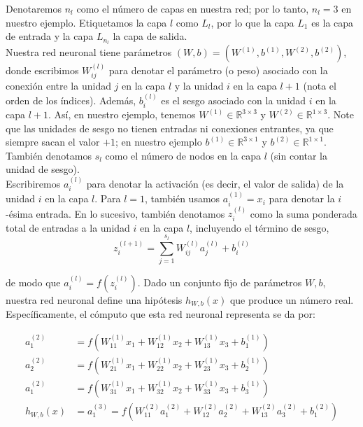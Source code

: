 Denotaremos $n_l$ como el número de capas en nuestra red; por lo tanto, $n_l = 3$ en nuestro ejemplo. Etiquetamos la capa $l$ como $L_l$, por lo que la capa $L_1$ es la capa de entrada y la capa $L_{n_l}$ la capa de salida. \\

Nuestra red neuronal tiene parámetros $(W, b) = (W^{(1)}, b^{(1)}, W^{(2)}, b^{(2)})$, donde escribimos $W_{ij}^{(l)}$ para denotar el parámetro (o peso) asociado con la conexión entre la unidad $j$ en la capa $l$ y la unidad $i$ en la capa $l+1$ (nota el orden de los índices). Además, $b_i^{(l)}$ es el sesgo asociado con la unidad $i$ en la capa $l+1$. Así, en nuestro ejemplo, tenemos $W^{(1)} \in \mathbb{R}^{3 \times 3}$ y $W^{(2)} \in \mathbb{R}^{1 \times 3}$. Note que las unidades de sesgo no tienen entradas ni conexiones entrantes, ya que siempre sacan el valor $+1$; en nuestro ejemplo $b^{(1)} \in \mathbb{R}^{3 \times 1}$ y $b^{(2)} \in \mathbb{R}^{1 \times 1}$. También denotamos $s_l$ como el número de nodos en la capa $l$ (sin contar la unidad de sesgo). \\

Escribiremos $a^{(l)}_i$ para denotar la activación (es decir, el valor de salida) de la unidad $i$ en la capa $l$. Para $l = 1$, también usamos $a^{(1)}_i = x_i$ para denotar la $i$-ésima entrada. En lo sucesivo, también denotamos $z^{(l)}_i$ como la suma ponderada total de entradas a la unidad $i$ en la capa $l$, incluyendo el término de sesgo,  
\begin{equation}
z_i^{(l+1)} = \sum_{j=1}^{s_l} W_{ij}^{(l)} a_j^{(l)} + b_i^{(l)}
\end{equation}

\noindent de modo que $a^{(l)}_i = f(z^{(l)}_i)$. Dado un conjunto fijo de parámetros $W, b$, nuestra red neuronal define una hipótesis $h_{W,b}(x)$ que produce un número real. Específicamente, el cómputo que esta red neuronal representa se da por:

\begin{align}
a_1^{(2)} &= f\left(W_{11}^{(1)} x_1 + W_{12}^{(1)} x_2 + W_{13}^{(1)} x_3 + b_1^{(1)}\right) \\
a_2^{(2)} &= f\left(W_{21}^{(1)} x_1 + W_{22}^{(1)} x_2 + W_{23}^{(1)} x_3 + b_2^{(1)}\right) \\
a_1^{(2)} &= f\left(W_{31}^{(1)} x_1 + W_{32}^{(1)} x_2 + W_{33}^{(1)} x_3 + b_3^{(1)}\right) \\
h_{W, b}(x) &= a_1^{(3)} = f\left(W_{11}^{(2)} a_1^{(2)} + W_{12}^{(2)}a_2^{(2)} + W_{13}^{(2)} a_3^{(2)} + b_1^{(2)}\right)
\end{align}

